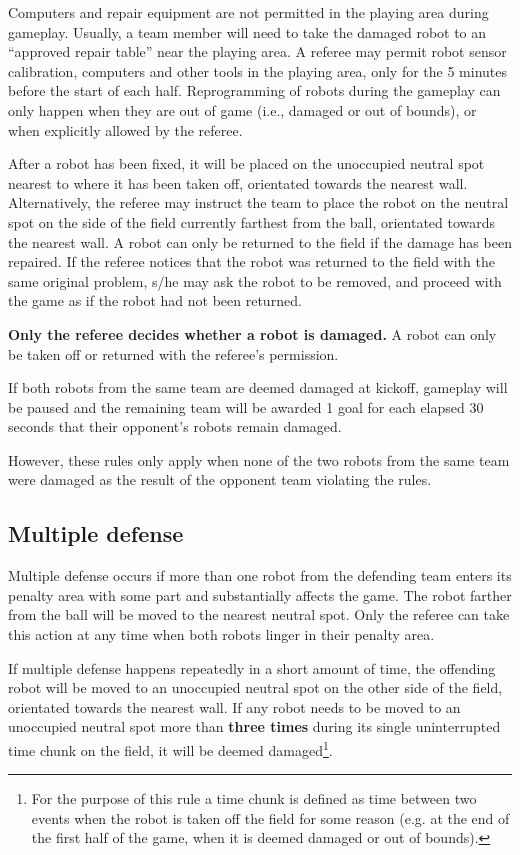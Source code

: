 \documentclass{article}
\begin{document}
Computers and repair equipment are not permitted in the playing area during
gameplay. Usually, a team member will need to take the damaged robot to an
``approved repair table'' near the playing area. A referee may permit robot
sensor calibration, computers and other tools in the playing area, only for the
5 minutes before the start of each half. Reprogramming of robots during the
gameplay can only happen when they are out of game (i.e., damaged or out of
bounds), or when explicitly allowed by the referee.

After a robot has been fixed, it will be placed on the unoccupied neutral spot
nearest to where it has been taken off, orientated towards the nearest wall.
Alternatively, the referee may instruct the team to place the robot on the
neutral spot on the side of the field currently farthest from the ball,
orientated towards the nearest wall.  A robot can only be returned to the field
if the damage has been repaired. If the referee notices that the robot was
returned to the field with the same original problem, s/he may ask the robot to
be removed, and proceed with the game as if the robot had not been returned.

\textbf{Only the referee decides whether a robot is damaged.} A robot can only
be taken off or returned with the referee's permission.

If both robots from the same team are deemed damaged at kickoff,
gameplay will be paused and the remaining team will be awarded 1 goal for
each elapsed 30 seconds that their opponent's robots remain damaged.

However, these rules only apply when none of the two robots from the same team
were damaged as the result of the opponent team violating the rules.


\subsection{Multiple defense \label{ref-013}}

Multiple defense occurs if more than one robot from the defending team enters
its penalty area with some part and substantially affects the game. The robot
farther from the ball will be moved to the nearest neutral spot.
Only the referee can take this action at any time when both
robots linger in their penalty area.

If multiple defense happens repeatedly in a short amount of time, the offending
robot will be moved to an unoccupied neutral spot on the other side of the
field, orientated towards the nearest wall.  If any robot needs to be moved to
an unoccupied neutral spot more than \textbf{three times} during its single
uninterrupted time chunk on the field, it will be deemed damaged\footnote{For
    the purpose of this rule a time chunk is defined as time between two events
    when the robot is taken off the field for some reason (e.g. at the end of
the first half of the game, when it is deemed damaged or out of bounds).}.
\end{document}
